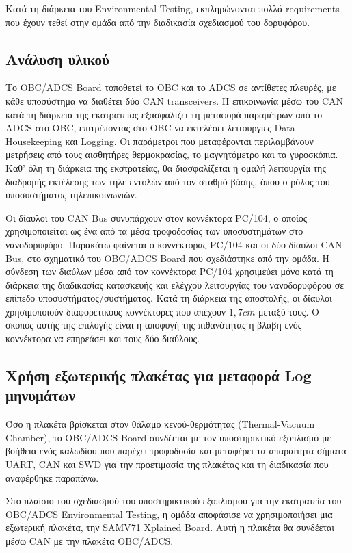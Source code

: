 \documentclass[a4paper,nobib,justified]{tufte-book}
\begin{document}
	Κατά τη διάρκεια του Environmental Testing, εκπληρώνονται πολλά requirements που έχουν τεθεί στην ομάδα από την διαδικασία σχεδιασμού του δορυφόρου.
	\subsection{Ανάλυση υλικού}
	Το OBC/ADCS Board τοποθετεί το OBC και το ADCS σε αντίθετες πλευρές, με κάθε υποσύστημα να διαθέτει δύο CAN transceivers. Η επικοινωνία μέσω του CAN κατά τη διάρκεια της εκστρατείας εξασφαλίζει τη μεταφορά παραμέτρων από το ADCS στο OBC, επιτρέποντας στο OBC να εκτελέσει λειτουργίες Data Housekeeping και Logging. Οι παράμετροι που μεταφέρονται περιλαμβάνουν μετρήσεις από τους αισθητήρες θερμοκρασίας, το μαγνητόμετρο και τα γυροσκόπια. Καθ' όλη τη διάρκεια της εκστρατείας, θα διασφαλίζεται η ομαλή λειτουργία της διαδρομής εκτέλεσης των τηλε-εντολών από τον σταθμό βάσης, όπου ο ρόλος του υποσυστήματος τηλεπικοινωνιών.

	Οι δίαυλοι του CAN Bus συνυπάρχουν στον κοννέκτορα PC/104, ο οποίος χρησιμοποιείται ως ένα από τα μέσα τροφοδοσίας των υποσυστημάτων στο νανοδορυφόρο. Παρακάτω φαίνεται ο κοννέκτορας PC/104 και οι δύο δίαυλοι CAN Bus, στο σχηματικό του OBC/ADCS Board που σχεδιάστηκε από την ομάδα. Η σύνδεση των διαύλων μέσα από τον κοννέκτορα PC/104 χρησιμεύει μόνο κατά τη διάρκεια της διαδικασίας κατασκευής και ελέγχου λειτουργίας του νανοδορυφόρου σε επίπεδο υποσυστήματος/συστήματος. Κατά τη διάρκεια της αποστολής, οι δίαυλοι χρησιμοποιούν διαφορετικούς κοννέκτορες που απέχουν $1,7cm$ μεταξύ τους. Ο σκοπός αυτής της επιλογής είναι η αποφυγή της πιθανότητας η βλάβη ενός κοννέκτορα να επηρεάσει και τους δύο διαύλους. 
	
	\subsection{Χρήση εξωτερικής πλακέτας για μεταφορά Log μηνυμάτων}
	Όσο η πλακέτα βρίσκεται στον θάλαμο κενού-θερμότητας (Thermal-Vacuum Chamber), το OBC/ADCS Board συνδέεται με τον υποστηρικτικό εξοπλισμό με βοήθεια ενός καλωδίου που παρέχει τροφοδοσία και μεταφέρει τα απαραίτητα σήματα UART, CAN και SWD για την προετιμασία της πλακέτας και τη διαδικασία που αναφέρθηκε παραπάνω.
	
	Στο πλαίσιο του σχεδιασμού του υποστηρικτικού εξοπλισμού για την εκστρατεία του OBC/ADCS Environmental Testing, η ομάδα αποφάσισε να χρησιμοποιήσει μια εξωτερική πλακέτα, την SAMV71 Xplained Board. Αυτή η πλακέτα θα συνδέεται μέσω CAN με την πλακέτα OBC/ADCS. 
\end{document}
